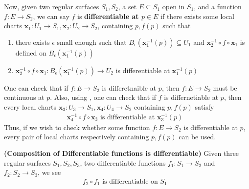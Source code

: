 \documentclass{report}
\begin{document}
\begin{mdframed}
Now, given two regular surfaces $S_1,S_2$, a set  $E\subseteq S_1$ open in $S_1$, and a function  $f:E\rightarrow S_2$, we can say $f$ is \textbf{differentiable at $p\in  E$} if there exists some local charts $\textbf{x}_1:U_1 \rightarrow S_1,\textbf{x}_2:U_2\rightarrow S_2$, containing $p,f(p)$ such that 
\begin{enumerate}[label=(\alph*)]
  \item there exists $\epsilon $ small enough such that $B_{\epsilon }(\textbf{x}_1^{-1}(p))\subseteq U_1$ and $\textbf{x}_2^{-1}\circ f\circ \textbf{x}_1$ is defined on $B_\epsilon (\textbf{x}_1^{-1}(p))$ 
  \item $\textbf{x}_2^{-1}\circ f\circ \textbf{x}_1:B_\epsilon (\textbf{x}_1^{-1}(p))\rightarrow U_2$ is differentiable at $\textbf{x}_1^{-1}(p)$
\end{enumerate}
One can check that if $f:E\rightarrow S_2$ is differetnaible at $p$, then  $f:E\rightarrow S_2$ must be continuous at  $p$. Also, using , one can check that if $f$ is differnetiable at $p$, then every local charts  $\textbf{x}_3:U_3\rightarrow S_1,\textbf{x}_4:U_4\rightarrow S_2$ containing $p,f(p)$ satisfy 
\begin{align*}
\textbf{x}_4^{-1}\circ f\circ \textbf{x}_3\text{ is differentiable at $\textbf{x}_3^{-1}(p)$ }
\end{align*}
Thus, if we wish to check whether some function $f:E\rightarrow S_2$ is differentiable at $p$, every pair of local charts respectively containing  $p,f(p)$ can be used.
\end{mdframed}
\begin{theorem}
\label{CoD}
\textbf{(Composition of Differentiable functions is differentiable)} Given three regular surfaces $S_1,S_2,S_3$, two differentiable functions $f_1:S_1\rightarrow S_2$ and $f_2:S_2\rightarrow S_3$, we see 
\begin{align*}
f_2\circ f_1\text{ is differentiable on $S_1$ }
\end{align*}
\end{theorem}
\end{document}
